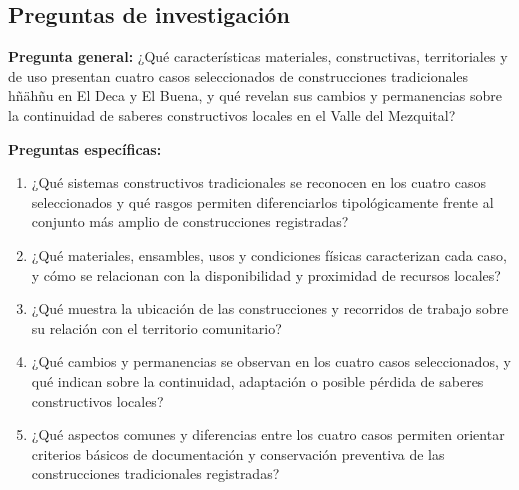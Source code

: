 \subsection{Preguntas de investigación}

\textbf{Pregunta general:} ¿Qué características materiales, constructivas, territoriales y de uso presentan cuatro casos seleccionados de construcciones tradicionales hñähñu en El Deca y El Buena, y qué revelan sus cambios y permanencias sobre la continuidad de saberes constructivos locales en el Valle del Mezquital?

\vspace{0.5em}

\textbf{Preguntas específicas:}

\begin{enumerate}
	\item {¿Qué sistemas constructivos tradicionales se reconocen en los cuatro casos seleccionados y qué rasgos permiten diferenciarlos tipológicamente frente al conjunto más amplio de construcciones registradas?}

	\item {¿Qué materiales, ensambles, usos y condiciones físicas caracterizan cada caso, y cómo se relacionan con la disponibilidad y proximidad de recursos locales?}

	\item {¿Qué muestra la ubicación de las construcciones y recorridos de trabajo sobre su relación con el territorio comunitario?}

	\item {¿Qué cambios y permanencias se observan en los cuatro casos seleccionados, y qué indican sobre la continuidad, adaptación o posible pérdida de saberes constructivos locales?}

	\item {¿Qué aspectos comunes y diferencias entre los cuatro casos permiten orientar criterios básicos de documentación y conservación preventiva de las construcciones tradicionales registradas?}



\end{enumerate}
